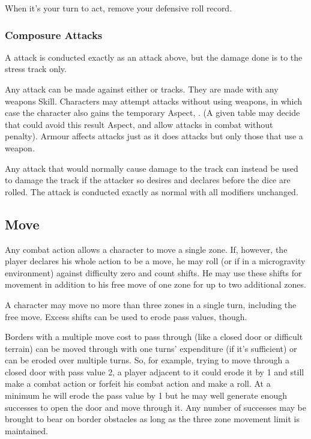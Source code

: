 When it's your turn to act, remove your defensive roll record.

\subsubsection{Composure Attacks}

A \Composure{} attack is conducted exactly as an attack above, but the damage done is to the \Composure{} stress track only.

Any attack can be made against either \Composure{} or \Health{} tracks. They are made with any weapons Skill. Characters may attempt \Composure{} attacks without using weapons, in which case the character also gains the temporary Aspect, . (A given table may decide that  could avoid this result Aspect, and allow  attacks in combat without penalty). Armour affects \Composure{} attacks just as it does \Health{} attacks but only those that use a weapon.

Any attack that would normally cause damage to the \Health{} track can instead be used to damage the \Composure{} track if the attacker so desires and declares before the dice are rolled. The attack is conducted exactly as normal with all modifiers unchanged.

\subsection{Move}\label{sec:personal-combat-move}

Any combat action allows a character to move a single zone. If, however, the player declares his whole action to be a move, he may roll  (or  if in a microgravity environment) against difficulty zero and count shifts. He may use these shifts for movement in addition to his free move of one zone for up to two additional zones.

A character may move no more than three zones in a single turn, including the free move. Excess shifts can be used to erode pass values, though.

Borders with a multiple move cost to pass through (like a closed door or difficult terrain) can be moved through with one turns' expenditure (if it's sufficient) or can be eroded over multiple turns. So, for example, trying to move through a closed door with pass value 2, a player adjacent to it could erode it by 1 and still make a combat action or forfeit his combat action and make a  roll. At a minimum he will erode the pass value by 1 but he may well generate enough successes to open the door and move through it. Any number of successes may be brought to bear on border obstacles as long as the three zone movement limit is maintained.

